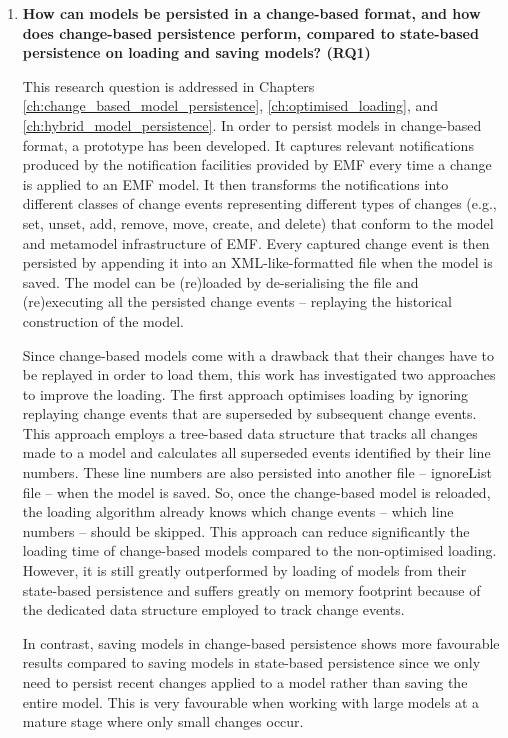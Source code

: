 \begin{enumerate} 
  \item \textbf{How can models be persisted in a change-based format, and how does change-based persistence perform, compared to state-based persistence on loading and saving models? (RQ1)} 
  
  This research question is addressed in Chapters \ref{ch:change_based_model_persistence}, \ref{ch:optimised_loading}, and \ref{ch:hybrid_model_persistence}. In order to persist models in change-based format, a prototype has been developed. It captures relevant notifications produced by the notification facilities provided by EMF every time a change is applied to an EMF model. It then transforms the notifications into different classes of change events representing different types of changes (e.g., set, unset, add, remove, move, create, and delete) that conform to the model and metamodel infrastructure of EMF. Every captured change event is then persisted by appending it into an XML-like-formatted file when the model is saved. The model can be (re)loaded by de-serialising the file and (re)executing all the persisted change events -- replaying the historical construction of the model.
  
  Since change-based models come with a drawback that their changes have to be replayed in order to load them, this work has investigated two approaches to improve the loading. The first approach optimises loading by ignoring replaying change events that are superseded by subsequent change events. This approach employs a tree-based data structure that tracks all changes made to a model and calculates all superseded events identified by their line numbers. These line numbers are also persisted into another file -- \textsf{ignoreList} file -- when the model is saved. So, once the change-based model is reloaded, the loading algorithm already knows which change events -- which line numbers -- should be skipped. This approach can reduce significantly the loading time of change-based models compared to the non-optimised loading. However, it is still greatly outperformed by loading of models from their state-based persistence and suffers greatly on memory footprint because of the dedicated data structure employed to track change events. 
  
  In contrast, saving models in change-based persistence shows more favourable results compared to saving models in state-based persistence since we only need to persist recent changes applied to a model rather than saving the entire model. This is very favourable when working with large models at a mature stage where only small changes occur. 
  

\end{enumerate}
